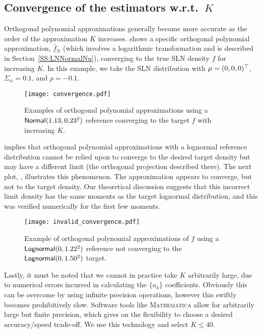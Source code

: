 \subsection{Convergence of the estimators  w.r.t.\ $K$ }

Orthogonal polynomial approximations generally become more accurate as the order of the approximation $K$ increases.  shows a specific orthogonal polynomial approximation, $\widehat{f}_{\mathrm{N}}$ (which involves a logarithmic transformation and is described in Section~\ref{SS:LNNormalNu}), converging to the true SLN density $f$ for increasing $K$. In this example, we take the SLN distribution with $\mu=(0,0,0)^\top$, $\Sigma_{ii} = 0.1$, and $\rho = -0.1$.

\begin{figure}
\centering
\texttt{[image: convergence.pdf]}
\caption{Examples of orthogonal polynomial approximations using a $\mathsf{Normal}(1.13,0.23^2)$ reference converging to the target $f$ with increasing $K$.}
\label{fig:converg}
\end{figure}

 implies that orthogonal polynomial approximations with a lognormal reference distribution cannot be relied upon to converge to the desired target density but may have a different limit (the orthogonal projection described there). The next plot, , illustrates this phenomenon. The approximation appears to converge, but not to the target density.
Our theoretical discussion suggests that this incorrect limit density has the same moments as the target lognormal distribution,
and this was verified numerically for the first few moments.

\begin{figure}
\centering
\texttt{[image: invalid\_convergence.pdf]}

\caption{Example of orthogonal polynomial approximations of $f$ using a $\mathsf{Lognormal}(0, 1.22^2)$ reference not converging to the $\mathsf{Lognormal}(0, 1.50^2)$ target.}
\label{fig:bad_converge}
\end{figure}

Lastly, it must be noted that we cannot in practice take $K$ arbitrarily large, due to numerical errors incurred in calculating the $\{a_k\}$ coefficients. Obviously this can be overcome by using infinite precision operations, however this swiftly becomes prohibitively slow. Software tools like \textsc{Mathematica} allow for arbitrarily large but finite precision, which gives on the flexibility to choose a desired accuracy/speed trade-off. We use this technology and select $K \le 40$.

